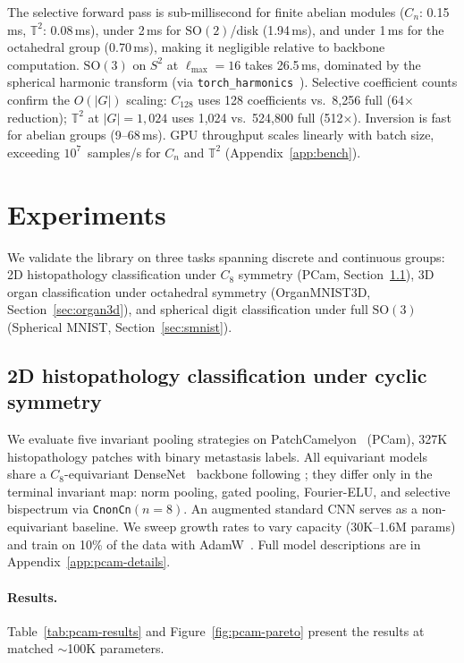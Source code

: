 \documentclass{article}
\theoremstyle{definition}
\theoremstyle{remark}
\newcommand{\SO}{\mathrm{SO}}
\theoremstyle{definition}
\begin{document}
The selective forward pass is sub-millisecond for finite abelian modules
($C_n$: 0.15\,ms, $\mathbb{T}^2$: 0.08\,ms), under 2\,ms for
$\SO(2)$/disk (1.94\,ms), and under 1\,ms for the octahedral group
(0.70\,ms), making it negligible relative to backbone computation. $\SO(3)$ on $S^2$ at
$\ell_{\max}{=}16$ takes 26.5\,ms, dominated by the spherical harmonic
transform (via \texttt{torch\_harmonics}~\citep{bonev2023spherical}).
Selective coefficient counts confirm the $O(|G|)$ scaling:
$C_{128}$ uses 128 coefficients vs.\ 8{,}256 full (64$\times$
reduction); $\mathbb{T}^2$ at $|G|{=}1{,}024$ uses 1{,}024 vs.\
524{,}800 full (512$\times$). Inversion is fast for abelian groups
(9--68\,ms). GPU throughput scales linearly with batch size,
exceeding $10^7$~samples/s for $C_n$ and $\mathbb{T}^2$
(Appendix~\ref{app:bench}).

\section{Experiments}
\label{sec:experiments}

We validate the library on three tasks spanning discrete and continuous
groups: 2D histopathology classification under $C_8$ symmetry (PCam,
Section~\ref{sec:pcam}), 3D organ classification under octahedral symmetry
(OrganMNIST3D, Section~\ref{sec:organ3d}), and spherical digit
classification under full $\SO(3)$ (Spherical MNIST,
Section~\ref{sec:smnist}).

\subsection{2D histopathology classification under cyclic symmetry}
\label{sec:pcam}

We evaluate five invariant pooling strategies on
PatchCamelyon~\citep{veeling2018rotation} (PCam), 327K histopathology
patches with binary metastasis labels. All equivariant models share a
$C_8$-equivariant DenseNet~\citep{huang2017densenet} backbone following
\citet{veeling2018rotation}; they differ only in the terminal invariant map:
norm pooling, gated pooling, Fourier-ELU, and selective bispectrum via
\texttt{CnonCn}$(n{=}8)$. An augmented standard CNN serves as a
non-equivariant baseline. We sweep growth rates to vary capacity
(30K--1.6M params) and train on 10\% of the data with
AdamW~\citep{loshchilov2019adamw}. Full model descriptions are in
Appendix~\ref{app:pcam-details}.

\paragraph{Results.}
Table~\ref{tab:pcam-results} and Figure~\ref{fig:pcam-pareto} present the
results at matched ${\sim}$100K parameters.
\end{document}

